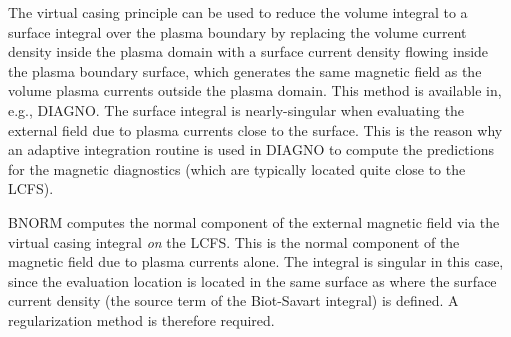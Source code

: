 The virtual casing principle can be used to reduce the volume integral
to a surface integral over the plasma boundary
by replacing the volume current density inside the plasma domain
with a surface current density flowing inside the plasma boundary surface,
which generates the same magnetic field as the volume plasma currents
outside the plasma domain.
This method is available in, e.g., DIAGNO.
The surface integral is nearly-singular when evaluating the external field due to plasma currents
close to the surface. This is the reason why an adaptive integration routine
is used in DIAGNO to compute the predictions for the magnetic diagnostics
(which are typically located quite close to the LCFS).

BNORM computes the normal component of the external magnetic field via the virtual casing integral \emph{on} the LCFS.
This is the normal component of the magnetic field due to plasma currents alone.
The integral is singular in this case, since the evaluation location is located
in the same surface as where the surface current density (the source term of the Biot-Savart integral) is defined.
A regularization method is therefore required.

\FloatBarrier
